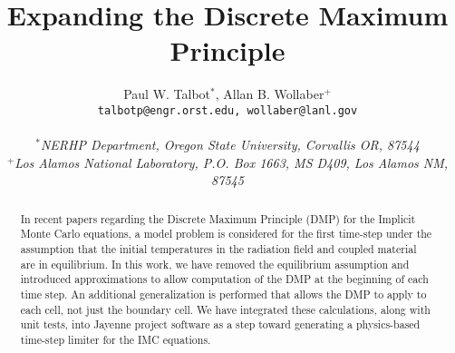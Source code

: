 \documentclass[12pt]{newmemo}
\title{Expanding the Discrete Maximum Principle}
\author{Paul W. Talbot$^*$, Allan B. Wollaber$^+$\\ \small
	\texttt{talbotp@engr.orst.edu, wollaber@lanl.gov} \\ \\
	\small\emph{$^*$NERHP Department, Oregon State University, Corvallis
		OR, 87544}\\\small
	\emph{$^+$Los Alamos National Laboratory, P.O. Box 1663, MS D409, Los
Alamos NM, 87545}}
\begin{document}

\begin{abstract}
In recent papers regarding the Discrete Maximum Principle (DMP) for the 
Implicit Monte Carlo equations, a model problem is considered for the 
first time-step under the assumption that the initial temperatures in 
the radiation field and coupled material are in equilibrium.   In this 
work, we have removed the equilibrium assumption and introduced 
approximations to allow computation of the DMP at the beginning of each 
time step.  An additional generalization is performed that allows the 
DMP to apply to each cell, not just the boundary cell.  We have 
integrated these calculations, along with unit tests, into Jayenne 
project software as a step toward generating a physics-based time-step 
limiter for the IMC equations.
\end{abstract}
\end{document}
